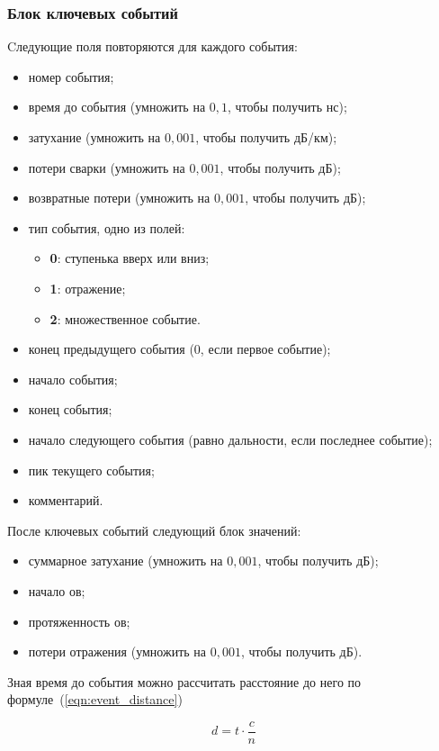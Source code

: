 \subsubsection{Блок ключевых событий}

Cледующие поля повторяются для каждого события:
\begin{itemize}
  \item номер события;
  \item время до события (умножить на $0,1$, чтобы получить нс);
  \item затухание (умножить на $0,001$, чтобы получить дБ/км);
  \item потери сварки (умножить на $0,001$, чтобы получить дБ);
  \item возвратные потери (умножить на $0,001$, чтобы получить дБ);
  \item тип события, одно из полей:
  \begin{itemize}
    \item \textbf{0}: ступенька вверх или вниз;
    \item \textbf{1}: отражение;
    \item \textbf{2}: множественное событие.
  \end{itemize}
  \item конец предыдущего события (0, если первое событие);
  \item начало события;
  \item конец события;
  \item начало следующего события (равно дальности, если последнее событие);
  \item пик текущего события;
  \item комментарий.
\end{itemize}

После ключевых событий следующий блок значений:
\begin{itemize}
  \item суммарное затухание (умножить на $0,001$, чтобы получить дБ);
  \item начало \acrshort{ов};
  \item протяженность \acrshort{ов};
  \item потери отражения (умножить на $0,001$, чтобы получить дБ).
\end{itemize}

Зная время до события можно рассчитать расстояние до него по формуле~(\ref{eqn:event_distance})

\begin{equation}
  \label{eqn:event_distance}
  d = t \cdot \frac{c}{n}
\end{equation}

